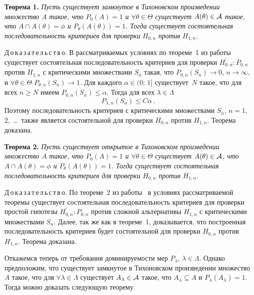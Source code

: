 \begin{multicols}{2}
    \medskip
    
        \noindent
    \textbf{Теорема 1.} \textit{Пусть существует замкнутое в Тихоновском 
произведении множество $A$ такое, что $P_0(A)=1$ и $\forall \theta\in\Theta$ 
существует $A(\theta ) \in \cal{A}$  такое, что $A\cap A(\theta )=\phi$ и 
$P_\theta (A(\theta)) =1$. Тогда существует состоятельная 
последовательность критериев для проверки} $H_{0,n}$ \textit{против} $H_{1,n}$.
    
    
    \smallskip
    
    \noindent
    Д\,о\,к\,а\,з\,а\,т\,е\,л\,ь\,с\,т\,в\,о. В рассматриваемых условиях по 
теореме~1 из работы~\cite{1gr} существует состоятельная последовательность 
критериев для проверки $H^\prime_{0,n}:P_{0,n}$ против $H_{1,n}$ с 
критическими множествами $S_n$ такая, что $P_{0,n}(S_n)\rightarrow 0$, $n\rightarrow 
\infty$, и $\forall \theta\in\Theta$ $P_{\theta,n}(S_n)\rightarrow 1$. Для каждого 
$\alpha\in (0;\,1]$ существует~$N$ такое, что для всех $n\geq N$ имеем 
$P_{0,n}(S_n)\leq \alpha$. Тогда для всех $\lambda\in \Lambda$
    $$
P_{\lambda,n} (S_n) \leq C\alpha\,.
$$
\noindent  
    Поэтому последовательность критериев с критическими множествами 
$S_n$, $n=1$, 2,\ \ldots\ также является состоятельной для проверки $H_{0,n}$ 
против $H_{1,n}$. Теорема доказана. 
    \medskip
    
    \noindent
    \textbf{Теорема 2.} \textit{Пусть существует открытое в Тихоновском 
произведении множество $A$ такое, что $P_0(A) =1$ и $\forall \theta\in\Theta$ 
существует $A(\theta ) \in \cal{A}$, что $A\cap A(\theta ) =\phi$ и $P_\theta 
(A(\theta )) =1$. Тогда существует состоятельная последовательность 
критериев для проверки $H_{0,n}$ против $H_{1,n}$.}
    
    \smallskip
    
    \noindent
    Д\,о\,к\,а\,з\,а\,т\,е\,л\,ь\,с\,т\,в\,о. По теореме~2 из работы~\cite{1gr} в условиях 
рассматриваемой теоремы существует состоятельная последовательность 
критериев для проверки простой гипотезы $H^\prime_{0,n}:P_{0,n}$ против 
сложной альтернативы $H_{1,n}$ с критическими множествами $S_n$. Далее,
так же как в теореме~1, доказывается, что построенная последовательность 
критериев будет  состоятельной для проверки $H_{0,n}$ против $H_{1,n}$. 
Теорема доказана.
    \smallskip
    
    Откажемся теперь от требования доминируемости мер $P_\lambda$, 
$\lambda\in\Lambda$. Однако предположим, что существует замкнутое в 
Тихоновском произведении множество $A$ такое, что для $\forall 
\lambda\in\Lambda$ существует $A_\lambda \in \cal{A}$  такое, что $A_\lambda 
\subseteq A$ и $P_\lambda (A_\lambda )=1$. Тогда можно доказать следующую 
теорему.
    

\end{multicols}
